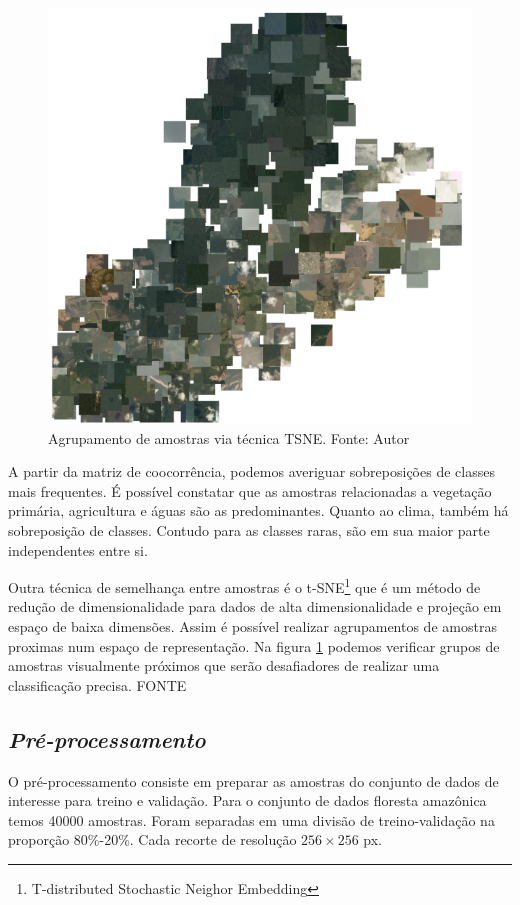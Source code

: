 \begin{figure}[!ht]
    \centering
    \includegraphics[width=0.9\columnwidth]{Imagens/results/EDA/TSNE.png}
    \caption{Agrupamento de amostras via técnica TSNE.
    Fonte: Autor}
   \label{fig:TSNE}
\end{figure}

A partir da matriz de coocorrência, podemos averiguar sobreposições de classes mais frequentes. É possível constatar que as amostras relacionadas a vegetação primária, agricultura e águas são as predominantes. Quanto ao clima, também há sobreposição de classes. Contudo para as classes raras, são em sua maior parte independentes entre si.

Outra técnica de semelhança entre amostras é o t-SNE\footnote[5]{T-distributed Stochastic Neighor Embedding} que é um método de redução de dimensionalidade para dados de alta dimensionalidade e projeção em espaço de baixa dimensões. Assim é possível realizar agrupamentos de amostras proximas num espaço de representação. Na figura \ref{fig:TSNE} podemos verificar grupos de amostras visualmente próximos que serão desafiadores de realizar uma classificação precisa. FONTE


\subsection{\textit{Pré-processamento}}\label{sec:Cap3_PreProcess}
O pré-processamento consiste em preparar as amostras do conjunto de dados de interesse para treino e validação. Para o conjunto de dados floresta amazônica temos 40000 amostras. Foram separadas em uma divisão de treino-validação na proporção 80\%-20\%. Cada recorte de resolução $256 \times 256$ px.

